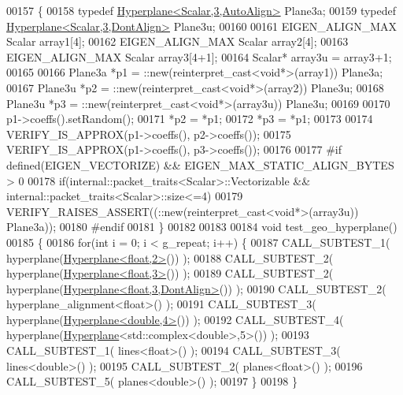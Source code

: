 \begin{DoxyCode}
00157 \{
00158   \textcolor{keyword}{typedef} \hyperlink{group___geometry___module_class_eigen_1_1_hyperplane}{Hyperplane<Scalar,3,AutoAlign>} Plane3a;
00159   \textcolor{keyword}{typedef} \hyperlink{group___geometry___module_class_eigen_1_1_hyperplane}{Hyperplane<Scalar,3,DontAlign>} Plane3u;
00160 
00161   EIGEN\_ALIGN\_MAX Scalar array1[4];
00162   EIGEN\_ALIGN\_MAX Scalar array2[4];
00163   EIGEN\_ALIGN\_MAX Scalar array3[4+1];
00164   Scalar* array3u = array3+1;
00165 
00166   Plane3a *p1 = ::new(reinterpret\_cast<void*>(array1)) Plane3a;
00167   Plane3u *p2 = ::new(reinterpret\_cast<void*>(array2)) Plane3u;
00168   Plane3u *p3 = ::new(reinterpret\_cast<void*>(array3u)) Plane3u;
00169   
00170   p1->coeffs().setRandom();
00171   *p2 = *p1;
00172   *p3 = *p1;
00173 
00174   VERIFY\_IS\_APPROX(p1->coeffs(), p2->coeffs());
00175   VERIFY\_IS\_APPROX(p1->coeffs(), p3->coeffs());
00176   
00177 \textcolor{preprocessor}{  #if defined(EIGEN\_VECTORIZE) && EIGEN\_MAX\_STATIC\_ALIGN\_BYTES > 0}
00178   \textcolor{keywordflow}{if}(internal::packet\_traits<Scalar>::Vectorizable && internal::packet\_traits<Scalar>::size<=4)
00179     VERIFY\_RAISES\_ASSERT((::\textcolor{keyword}{new}(reinterpret\_cast<void*>(array3u)) Plane3a));
00180 \textcolor{preprocessor}{  #endif}
00181 \}
00182 
00183 
00184 \textcolor{keywordtype}{void} test\_geo\_hyperplane()
00185 \{
00186   \textcolor{keywordflow}{for}(\textcolor{keywordtype}{int} i = 0; i < g\_repeat; i++) \{
00187     CALL\_SUBTEST\_1( hyperplane(\hyperlink{group___geometry___module_class_eigen_1_1_hyperplane}{Hyperplane<float,2>}()) );
00188     CALL\_SUBTEST\_2( hyperplane(\hyperlink{group___geometry___module_class_eigen_1_1_hyperplane}{Hyperplane<float,3>}()) );
00189     CALL\_SUBTEST\_2( hyperplane(\hyperlink{group___geometry___module_class_eigen_1_1_hyperplane}{Hyperplane<float,3,DontAlign>}()) );
00190     CALL\_SUBTEST\_2( hyperplane\_alignment<float>() );
00191     CALL\_SUBTEST\_3( hyperplane(\hyperlink{group___geometry___module_class_eigen_1_1_hyperplane}{Hyperplane<double,4>}()) );
00192     CALL\_SUBTEST\_4( hyperplane(\hyperlink{group___geometry___module_class_eigen_1_1_hyperplane}{Hyperplane}<std::complex<double>,5>()) );
00193     CALL\_SUBTEST\_1( lines<float>() );
00194     CALL\_SUBTEST\_3( lines<double>() );
00195     CALL\_SUBTEST\_2( planes<float>() );
00196     CALL\_SUBTEST\_5( planes<double>() );
00197   \}
00198 \}
\end{DoxyCode}
